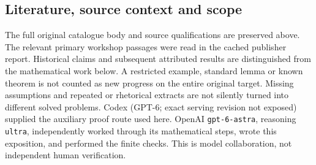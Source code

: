 \documentclass[11pt]{article}
\begin{document}
\subsection{Literature, source context and scope}
The full original catalogue body and source qualifications are preserved above. The relevant primary workshop passages were read in the cached publisher report. Historical claims and subsequent attributed results are distinguished from the mathematical work below. A restricted example, standard lemma or known theorem is not counted as new progress on the entire original target. Missing assumptions and repeated or rhetorical extracts are not silently turned into different solved problems.
Codex (GPT-6; exact serving revision not exposed) supplied the auxiliary proof route used here. OpenAI \texttt{gpt-6-astra}, reasoning \texttt{ultra}, independently worked through its mathematical steps, wrote this exposition, and performed the finite checks. This is model collaboration, not independent human verification.
\end{document}
